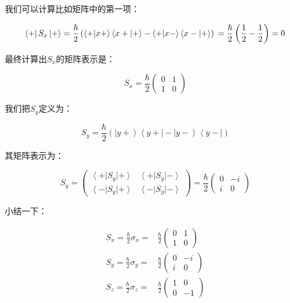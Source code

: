我们可以计算比如矩阵中的第一项：

\begin{equation}
\left\langle + \right| S_x \left| + \right\rangle = \frac{\hbar}{2} \left( \left\langle + | x+ \right\rangle \left\langle x+ | + \right\rangle - \left\langle + | x- \right\rangle \left\langle x- | + \right\rangle   \right) \\
{} = \frac{\hbar}{2} \left( \frac{1}{2} - \frac{1}{2} \right) = 0~
\end{equation}

最终计算出$S_x$的矩阵表示是：

\begin{equation}
S_x  = \frac{\hbar}{2} \left( \begin{array}{ccc} 0 &  1 \\ 1 & 0 \end{array} \right)~
\end{equation}

我们把$S_y$定义为：

\begin{equation}
S_y = \frac{\hbar}{2} \left( \left| y+ \right\rangle \left\langle y+ \right| - \left| y- \right\rangle \left\langle y- \right| \right)~
\end{equation}

其矩阵表示为：

\begin{equation}
S_y \dot = \left( \begin{array}{ccc}  \left\langle + \right| S_y \left| + \right\rangle  &  \left\langle + \right| S_y \left| - \right\rangle \\   \left\langle - \right| S_y \left| + \right\rangle  &   \left\langle - \right| S_y \left| - \right\rangle  \end{array} \right) = \frac{\hbar}{2} \left( \begin{array}{ccc} 0 &  -i \\ i & 0 \end{array} \right) ~
\end{equation}

小结一下：

\begin{align}
S_x = \frac{\hbar}{2} \sigma_x =&  \frac{\hbar}{2} \left( \begin{array}{ccc} 0 &  1 \\ 1 & 0 \end{array} \right)~ \\
S_y = \frac{\hbar}{2} \sigma_y =&\frac{\hbar}{2} \left( \begin{array}{ccc} 0 &  -i \\ i & 0 \end{array} \right)~  \\
S_z = \frac{\hbar}{2} \sigma_z =& \frac{\hbar}{2} \left( \begin{array}{ccc} 1 &  0 \\ 0 & -1 \end{array} \right)~
\end{align}

